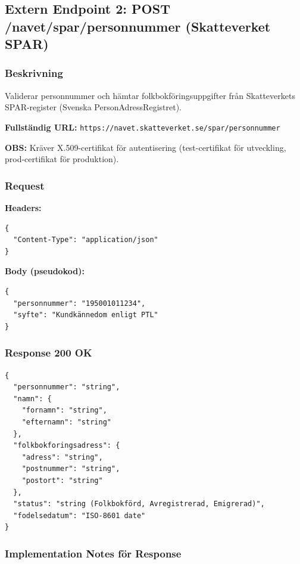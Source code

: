 \subsection{Extern Endpoint 2: POST /navet/spar/personnummer (Skatteverket SPAR)}

\subsubsection{Beskrivning}

Validerar personnummer och hämtar folkbokföringsuppgifter från Skatteverkets SPAR-register (Svenska PersonAdressRegistret).

\textbf{Fullständig URL:} \texttt{https://navet.skatteverket.se/spar/personnummer}

\textbf{OBS:} Kräver X.509-certifikat för autentisering (test-certifikat för utveckling, prod-certifikat för produktion).

\subsubsection{Request}

\textbf{Headers:}
\begin{lstlisting}
{
  "Content-Type": "application/json"
}
\end{lstlisting}

\textbf{Body (pseudokod):}
\begin{lstlisting}
{
  "personnummer": "195001011234",
  "syfte": "Kundkännedom enligt PTL"
}
\end{lstlisting}

\subsubsection{Response 200 OK}
\begin{lstlisting}
{
  "personnummer": "string",
  "namn": {
    "fornamn": "string",
    "efternamn": "string"
  },
  "folkbokforingsadress": {
    "adress": "string",
    "postnummer": "string",
    "postort": "string"
  },
  "status": "string (Folkbokförd, Avregistrerad, Emigrerad)",
  "fodelsedatum": "ISO-8601 date"
}
\end{lstlisting}

\subsubsection{Implementation Notes för Response}

